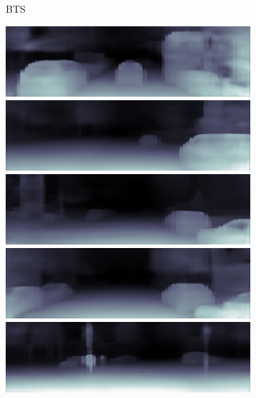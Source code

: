 \begin{figure}[htb]
\begin{subfigure}{0.15\linewidth}
\begin{minipage}[b]{1\linewidth}
  \end{minipage}
  \caption{BTS\cite{bts}}
  \end{subfigure}
  \begin{subfigure}{0.15\linewidth}
  \begin{minipage}[b]{1\linewidth}
  \includegraphics[width=1\linewidth]{figure/kitti_result/2011_09_26_drive_0052_sync_0000000000.png}\vspace{5pt}
  \includegraphics[width=1\linewidth]{figure/kitti_result/2011_09_26_drive_0013_sync_0000000035.png}\vspace{5pt}
  \includegraphics[width=1\linewidth]{figure/kitti_result/2011_09_26_drive_0009_sync_0000000260.png}\vspace{5pt}
  \includegraphics[width=1\linewidth]{figure/kitti_result/2011_09_26_drive_0009_sync_0000000340.png}\vspace{5pt}
  \includegraphics[width=1\linewidth]{figure/kitti_result/2011_09_26_drive_0009_sync_0000000388.png}\vspace{5pt}

\end{minipage}
\end{subfigure}
\end{figure}
